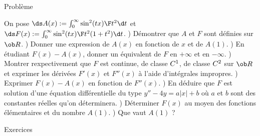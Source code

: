 {}

\eject
\centerline{\fourteenbf Probl\`eme}
\bigskip
\medskip \noindent
On pose $\ds A(x):=\int_0^\infty{\sin^2(tx)\F t^2}\d t$ et $\ds F(x):=\int_0^\infty{\sin^2(tx)\F t^2(1+t^2)}\d t$. 
\medskip
{}) D\'emontrer que $A$ et $F$ sont d\'efinies sur $\ob R$. 
\medskip
{}) Donner une expression de $A(x)$ en fonction de $x$ et de $A(1)$. 
\medskip
{}) En \'etudiant $F(x)-A(x)$, donner un \'equivalent de $F$ en $+\infty$ et en $-\infty$. 
\medskip
{}) Montrer rexpectivement que $F$ est continue, de classe $\sc C^1$, de classe $\sc C^2$ sur $\ob R$ et 
exprimer les d\'eriv\'ees $F'(x)$ et $F''(x)$ \`a l'aide d'int\'egrales impropres. 
\medskip
{}) Exprimer $F(x)-A(x)$ en fonction de $F''(x)$. 
\medskip
{}) En d\'eduire que $F$ est solution d'une \'equation diff\'erentielle 
du type $y''-4y=a|x|+b$ o\`u $a$ et $b$ sont des constantes r\'eelles qu'on d\'eterminera. 
\medskip
{}) D\'eterminer $F(x)$ au moyen des fonctions \'el\'ementaires et du nombre $A(1)$. 
\medskip
{}) Que vaut $A(1)$ ? 
\vfill
\centerline{\fourteenbf Exercices}
\bigskip\bigskip \noindent
{}
\vfill
{}
\vfill
{}
\vfill
\bye